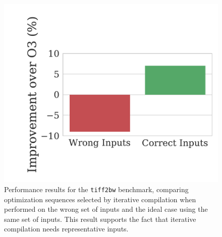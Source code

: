 \begin{figure}[t]
    \centering
    \includegraphics[width=0.7\linewidth]{figs/motivation_wrong_inputs.pdf}
    \caption{Performance results for the \texttt{tiff2bw} benchmark, comparing optimization sequences selected by iterative compilation when performed on the wrong set of inputs and the ideal case using the same set of inputs.
    This result supports the fact that iterative compilation needs representative inputs.}
    \label{fig:motivation_wrong_inputs}
\end{figure}


